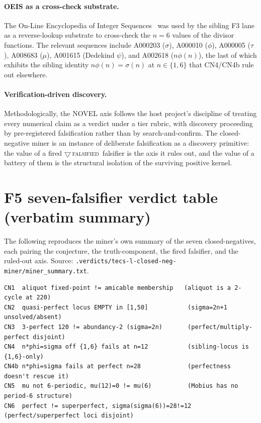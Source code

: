\documentclass[11pt,a4paper]{article}
\newcommand{\sig}{\sigma}
\newcommand{\tierR}{\textcolor{red!70!black}{$\bigtriangledown$}\,\textsc{falsified}}
\theoremstyle{definition}
\begin{document}
\paragraph{OEIS as a cross-check substrate.} The On-Line Encyclopedia of
Integer Sequences~\cite{oeisA000396,oeisA002618} was used by the sibling F3 lane
as a reverse-lookup substrate to cross-check the $n=6$ values of the divisor
functions. The relevant sequences include A000203 ($\sig$), A000010 ($\phi$),
A000005 ($\tau$), A008683 ($\mu$), A001615 (Dedekind $\psi$), and A002618
($n\phi(n)$), the last of which exhibits the sibling identity $n\phi(n)=\sig(n)$
at $n\in\{1,6\}$ that CN4/CN4b rule out elsewhere.

\paragraph{Verification-driven discovery.} Methodologically, the NOVEL axis
follows the host project's discipline of treating every numerical claim as a
verdict under a tier rubric, with discovery proceeding by pre-registered
falsification rather than by search-and-confirm. The closed-negative miner is an
instance of deliberate falsification as a discovery primitive: the value of a
fired \tierR\ falsifier is the axis it rules out, and the value of a battery of
them is the structural isolation of the surviving positive kernel.

\appendix

\section{F5 seven-falsifier verdict table (verbatim summary)}
\label{app:f5-table}

The following reproduces the miner's own summary of the seven closed-negatives,
each pairing the conjecture, the truth-component, the fired falsifier, and the
ruled-out axis. Source: \texttt{.verdicts/tecs-l-closed-neg-miner/miner\_summary.txt}.

\begin{verbatim}
CN1  aliquot fixed-point != amicable membership   (aliquot is a 2-cycle at 220)
CN2  quasi-perfect locus EMPTY in [1,50]           (sigma=2n+1 unsolved/absent)
CN3  3-perfect 120 != abundancy-2 (sigma=2n)       (perfect/multiply-perfect disjoint)
CN4  n*phi=sigma off {1,6} fails at n=12           (sibling-locus is {1,6}-only)
CN4b n*phi=sigma fails at perfect n=28             (perfectness doesn't rescue it)
CN5  mu not 6-periodic, mu(12)=0 != mu(6)          (Mobius has no period-6 structure)
CN6  perfect != superperfect, sigma(sigma(6))=28!=12 (perfect/superperfect loci disjoint)
\end{verbatim}
\end{document}

